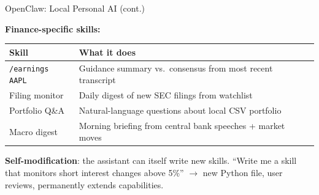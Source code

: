 \documentclass[9pt,t]{beamer}
\begin{document}
\begin{frame}[noframenumbering]{OpenClaw: Local Personal AI (cont.)}

\textbf{Finance-specific skills:}
\begin{center}
\small
\begin{tabular}{ll}
\toprule
Skill & What it does \\
\midrule
\texttt{/earnings AAPL} & Guidance summary vs.\ consensus from most recent transcript \\
Filing monitor & Daily digest of new SEC filings from watchlist \\
Portfolio Q\&A & Natural-language questions about local CSV portfolio \\
Macro digest & Morning briefing from central bank speeches + market moves \\
\bottomrule
\end{tabular}
\end{center}

\medskip
\textbf{Self-modification}: the assistant can itself write new skills. ``Write me a skill that monitors short interest changes above 5\%'' $\to$ new Python file, user reviews, permanently extends capabilities.
\end{frame}
\end{document}
